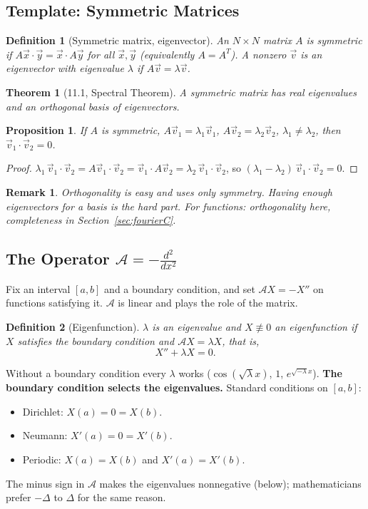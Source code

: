 \documentclass{article}
\newtheorem{theorem}{Theorem}
\newtheorem{definition}{Definition}
\newtheorem{remark}{Remark}
\newtheorem{proposition}{Proposition}
\begin{document}
\subsection{Template: Symmetric Matrices}
\begin{definition}[Symmetric matrix, eigenvector]
    An $N \times N$ matrix $A$ is symmetric if $A\vec{x}\cdot\vec{y} = \vec{x}\cdot A\vec{y}$ for all $\vec{x}, \vec{y}$ (equivalently $A = A^T$). A nonzero $\vec{v}$ is an eigenvector with eigenvalue $\lambda$ if $A\vec{v} = \lambda\vec{v}$.
\end{definition}
\begin{theorem}[11.1, Spectral Theorem]
    A symmetric matrix has real eigenvalues and an orthogonal basis of eigenvectors.
\end{theorem}
\begin{proposition}
    If $A$ is symmetric, $A\vec{v}_1 = \lambda_1\vec{v}_1$, $A\vec{v}_2 = \lambda_2\vec{v}_2$, $\lambda_1 \neq \lambda_2$, then $\vec{v}_1\cdot\vec{v}_2 = 0$.
\end{proposition}
\begin{proof}
    $\lambda_1\,\vec{v}_1\cdot\vec{v}_2 = A\vec{v}_1\cdot\vec{v}_2 = \vec{v}_1\cdot A\vec{v}_2 = \lambda_2\,\vec{v}_1\cdot\vec{v}_2$, so $(\lambda_1 - \lambda_2)\,\vec{v}_1\cdot\vec{v}_2 = 0$.
\end{proof}
\begin{remark}
    Orthogonality is easy and uses only symmetry. Having \emph{enough} eigenvectors for a basis is the hard part. For functions: orthogonality here, completeness in Section~\ref{sec:fourierC}.
\end{remark}

\subsection{The Operator $\mathcal{A} = -\frac{d^2}{dx^2}$}
Fix an interval $[a,b]$ and a boundary condition, and set $\mathcal{A}X = -X''$ on functions satisfying it. $\mathcal{A}$ is linear and plays the role of the matrix.
\begin{definition}[Eigenfunction]
    $\lambda$ is an eigenvalue and $X \not\equiv 0$ an eigenfunction if $X$ satisfies the boundary condition and $\mathcal{A}X = \lambda X$, that is,
    \begin{equation}
        X'' + \lambda X = 0.
    \end{equation}
\end{definition}
Without a boundary condition every $\lambda$ works ($\cos(\sqrt\lambda x)$, $1$, $e^{\sqrt{-\lambda}x}$). \textbf{The boundary condition selects the eigenvalues.} Standard conditions on $[a,b]$:
\begin{itemize}
    \item Dirichlet: $X(a) = 0 = X(b)$.
    \item Neumann: $X'(a) = 0 = X'(b)$.
    \item Periodic: $X(a) = X(b)$ and $X'(a) = X'(b)$.
\end{itemize}
The minus sign in $\mathcal{A}$ makes the eigenvalues nonnegative (below); mathematicians prefer $-\Delta$ to $\Delta$ for the same reason.
\end{document}
